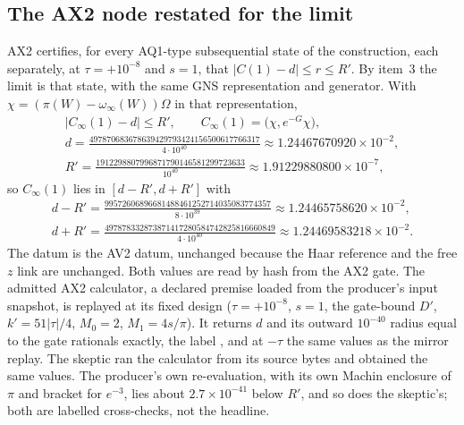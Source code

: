 \subsection{The AX2 node restated for the limit}
\label{sec:bc2-node}
AX2 certifies, for every AQ1-type subsequential state of the construction,
each separately, at $\tau=+10^{-8}$ and $s=1$, that $|C(1)-d|\le r\le R'$. By
item~3 the limit is that state, with the same GNS representation and
generator. With $\chi=(\pi(W)-\omega_\infty(W))\Omega$ in that
representation,
\begin{equation}
 \begin{gathered}
 |C_\infty(1)-d|\le R',\qquad C_\infty(1)=\bigl(\chi,e^{-G}\chi\bigr),\\
 d=\frac{497870683678639429793424156500617766317}{4\cdot10^{40}}\approx1.24467670920\times10^{-2},\\
 R'=\frac{1912298807996871790146581299723633}{10^{40}}\approx1.91229880800\times10^{-7},
 \end{gathered}
 \label{eq:bc2-node}
\end{equation}
so $C_\infty(1)$ lies in $[d-R',d+R']$ with
\begin{equation}
 \begin{gathered}
 d-R'=\frac{99572606896681488461252714035083774357}{8\cdot10^{39}}\approx1.24465758620\times10^{-2},\\
 d+R'=\frac{497878332873871417280584742825816660849}{4\cdot10^{40}}\approx1.24469583218\times10^{-2}.
 \end{gathered}
 \label{eq:bc2-node-interval}
\end{equation}
The datum is the AV2 datum, unchanged because the Haar reference and the free
$z$ link are unchanged. Both values are read by hash from the AX2 gate. The
admitted AX2 calculator, a declared premise loaded from the producer's input
snapshot, is replayed at its fixed design ($\tau=+10^{-8}$, $s=1$, the
gate-bound $D'$, $k'=51|\tau|/4$, $M_0=2$, $M_1=4s/\pi$). It returns $d$ and
its outward $10^{-40}$ radius equal to the gate rationals exactly, the label
, and at $-\tau$ the same values as the mirror
replay. The skeptic ran the calculator from its source bytes and obtained the
same values. The producer's own re-evaluation, with its own Machin enclosure
of $\pi$ and bracket for $e^{-3}$, lies about $2.7\times10^{-41}$ below $R'$,
and so does the skeptic's; both are labelled cross-checks, not the headline.

